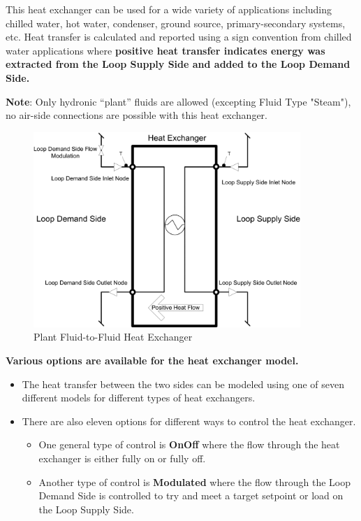 This heat exchanger can be used for a wide variety of applications including chilled water, hot water, condenser, ground source, primary-secondary systems, etc.
Heat transfer is calculated and reported using a sign convention from chilled water applications
where \textbf{positive heat transfer indicates energy was extracted from the Loop Supply Side and added to the Loop Demand Side.}

\textbf{Note}: Only hydronic ``plant'' fluids are allowed (excepting Fluid Type "Steam"), no air-side connections are possible with this heat exchanger.

\begin{figure}[hbtp] %
\centering
\includegraphics[width=0.9\textwidth, height=0.9\textheight, keepaspectratio=true]{media/image207.png}
\caption{Plant Fluid-to-Fluid Heat Exchanger \protect \label{fig:plant-fluid-to-fluid-heat-exchanger}}
\end{figure}

\textbf{Various options are available for the heat exchanger model.}
\begin{itemize}
\item
    The heat transfer between the two sides can be modeled using one of seven different models for different types of heat exchangers.
\item
    There are also eleven options for different ways to control the heat exchanger.
    \begin{itemize}
        \item
            One general type of control is \textbf{OnOff} where the flow through the heat exchanger is either fully on or fully off.
        \item
            Another type of control is \textbf{Modulated} where the flow through the Loop Demand Side is controlled to try and meet a target setpoint or load on the Loop Supply Side.
    \end{itemize}
\end{itemize}

